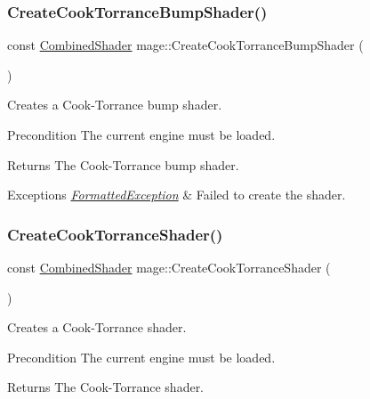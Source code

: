 \hypertarget{namespacemage_af62df91c14aff7f9f3897cd9c3834f58}{}\label{namespacemage_af62df91c14aff7f9f3897cd9c3834f58} 
\subsubsection{\texorpdfstring{Create\+Cook\+Torrance\+Bump\+Shader()}{CreateCookTorranceBumpShader()}}
{\footnotesize\ttfamily const \hyperlink{structmage_1_1_combined_shader}{Combined\+Shader} mage\+::\+Create\+Cook\+Torrance\+Bump\+Shader (\begin{DoxyParamCaption}{ }\end{DoxyParamCaption})}

Creates a Cook-\/\+Torrance bump shader.

\begin{DoxyPrecond}{Precondition}
The current engine must be loaded. 
\end{DoxyPrecond}
\begin{DoxyReturn}{Returns}
The Cook-\/\+Torrance bump shader. 
\end{DoxyReturn}

\begin{DoxyExceptions}{Exceptions}
{\em \hyperlink{structmage_1_1_formatted_exception}{Formatted\+Exception}} & Failed to create the shader. \\
\hline
\end{DoxyExceptions}
\hypertarget{namespacemage_a162bd40744ba3a73b6c80d9afcac3419}{}\label{namespacemage_a162bd40744ba3a73b6c80d9afcac3419} 
\subsubsection{\texorpdfstring{Create\+Cook\+Torrance\+Shader()}{CreateCookTorranceShader()}}
{\footnotesize\ttfamily const \hyperlink{structmage_1_1_combined_shader}{Combined\+Shader} mage\+::\+Create\+Cook\+Torrance\+Shader (\begin{DoxyParamCaption}{ }\end{DoxyParamCaption})}

Creates a Cook-\/\+Torrance shader.

\begin{DoxyPrecond}{Precondition}
The current engine must be loaded. 
\end{DoxyPrecond}
\begin{DoxyReturn}{Returns}
The Cook-\/\+Torrance shader. 
\end{DoxyReturn}

